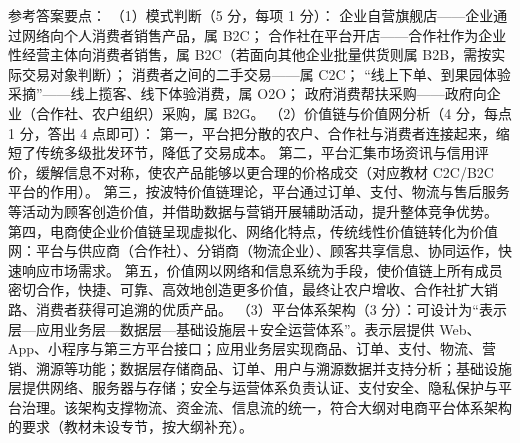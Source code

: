 \documentclass[a4paper,11pt]{article}
\begin{document}
\q 参考答案要点：
（1）模式判断（5 分，每项 1 分）：
企业自营旗舰店——企业通过网络向个人消费者销售产品，属 B2C；
合作社在平台开店——合作社作为企业性经营主体向消费者销售，属 B2C（若面向其他企业批量供货则属 B2B，需按实际交易对象判断）；
消费者之间的二手交易——属 C2C；
“线上下单、到果园体验采摘”——线上揽客、线下体验消费，属 O2O；
政府消费帮扶采购——政府向企业（合作社、农户组织）采购，属 B2G。
（2）价值链与价值网分析（4 分，每点 1 分，答出 4 点即可）：
第一，平台把分散的农户、合作社与消费者连接起来，缩短了传统多级批发环节，降低了交易成本。
第二，平台汇集市场资讯与信用评价，缓解信息不对称，使农产品能够以更合理的价格成交（对应教材 C2C/B2C 平台的作用）。
第三，按波特价值链理论，平台通过订单、支付、物流与售后服务等活动为顾客创造价值，并借助数据与营销开展辅助活动，提升整体竞争优势。
第四，电商使企业价值链呈现虚拟化、网络化特点，传统线性价值链转化为价值网：平台与供应商（合作社）、分销商（物流企业）、顾客共享信息、协同运作，快速响应市场需求。
第五，价值网以网络和信息系统为手段，使价值链上所有成员密切合作，快捷、可靠、高效地创造更多价值，最终让农户增收、合作社扩大销路、消费者获得可追溯的优质产品。
（3）平台体系架构（3 分）：可设计为“表示层—应用业务层—数据层—基础设施层＋安全运营体系”。表示层提供 Web、App、小程序与第三方平台接口；应用业务层实现商品、订单、支付、物流、营销、溯源等功能；数据层存储商品、订单、用户与溯源数据并支持分析；基础设施层提供网络、服务器与存储；安全与运营体系负责认证、支付安全、隐私保护与平台治理。该架构支撑物流、资金流、信息流的统一，符合大纲对电商平台体系架构的要求（教材未设专节，按大纲补充）。
\end{document}
